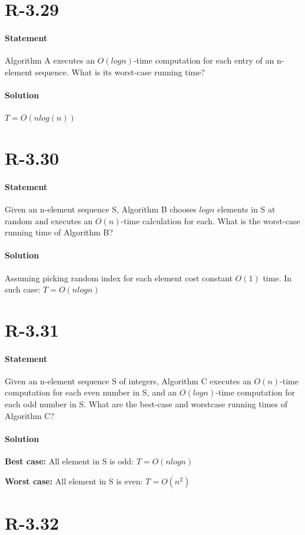 \documentclass{article}
\begin{document}
\section{R-3.29}
  \paragraph{Statement}
  Algorithm A executes an $O(log n)$-time computation for each entry of an n-element sequence. What is its worst-case running time?
  \paragraph{Solution}
  $T=O(nlog(n))$
\newpage
\section{R-3.30}
  \paragraph{Statement}
  Given an n-element sequence S, Algorithm B chooses $logn$ elements in S at random and executes an $O(n)$-time calculation for each. What is the worst-case running time of Algorithm B?
  \paragraph{Solution}
  Assuming picking random index for each element cost constant $O(1)$ time. In such case: $T=O(nlogn)$
\section{R-3.31}
  \paragraph{Statement}
  Given an n-element sequence S of integers, Algorithm C executes an $O(n)$-time computation for each even number in S, and an $O(logn)$-time computation for each odd number in S. What are the best-case and worstcase running times of Algorithm C?
  \paragraph{Solution}
  \textbf{Best case:} All element in S is odd: $T=O(nlogn)$\par
  \textbf{Worst case:} All element in S is even: $T=O(n^2)$
\section{R-3.32}
\end{document}
